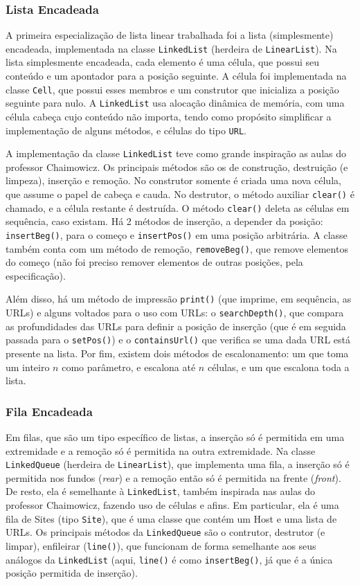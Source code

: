 \documentclass{article}
\def\code#1{\texttt{#1}}
\begin{document}
\subsubsection{Lista Encadeada}

A primeira especialização de lista linear trabalhada foi a lista (simplesmente) encadeada, implementada na classe \code{LinkedList} (herdeira de \code{LinearList}). Na lista simplesmente encadeada, cada elemento é uma célula, que possui seu conteúdo e um apontador para a posição seguinte. A célula foi implementada na classe \code{Cell}, que possui esses membros e um construtor que inicializa a posição seguinte para nulo. A \code{LinkedList} usa alocação dinâmica de memória, com uma célula cabeça cujo conteúdo não importa, tendo como propósito simplificar a implementação de alguns métodos, e células do tipo \code{URL}.

A implementação da classe \code{LinkedList} teve como grande inspiração as aulas do professor Chaimowicz. Os principais métodos são os de construção, destruição (e limpeza), inserção e remoção. No construtor somente é criada uma nova célula, que assume o papel de cabeça e cauda. No destrutor, o método auxiliar \code{clear()} é chamado, e a célula restante é destruída. O método \code{clear()} deleta as células em sequência, caso existam. Há 2 métodos de inserção, a depender da posição: \code{insertBeg()}, para o começo e \code{insertPos()} em uma posição arbitrária. A classe também conta com um método de remoção, \code{removeBeg()}, que remove elementos do começo (não foi preciso remover elementos de outras posições, pela especificação).

Além disso, há um método de impressão \code{print()} (que imprime, em sequência, as URLs) e alguns voltados para o uso com URLs: o \code{searchDepth()}, que compara as profundidades das URLs para definir a posição de inserção (que é em seguida passada para o \code{setPos()}) e o \code{containsUrl()} que verifica se uma dada URL está presente na lista. Por fim, existem dois métodos de escalonamento: um que toma um inteiro \( n \) como parâmetro, e escalona até \( n \) células, e um que escalona toda a lista.

\subsubsection{Fila Encadeada}

Em filas, que são um tipo específico de listas, a inserção só é permitida em uma extremidade e a remoção só é permitida na outra extremidade. Na classe \code{LinkedQueue} (herdeira de \code{LinearList}), que implementa uma fila, a inserção só é permitida nos fundos (\textit{rear}) e a remoção então só é permitida na frente (\textit{front}). De resto, ela é semelhante à \code{LinkedList}, também inspirada nas aulas do professor Chaimowicz, fazendo uso de células e afins. Em particular, ela é uma fila de Sites (tipo \code{Site}), que é uma classe que contém um Host e uma lista de URLs. Os principais métodos da \code{LinkedQueue} são o contrutor, destrutor (e limpar), enfileirar (\code{line()}), que funcionam de forma semelhante aos seus análogos da \code{LinkedList} (aqui, \code{line()} é como \code{insertBeg()}, já que é a única posição permitida de inserção).
\end{document}
